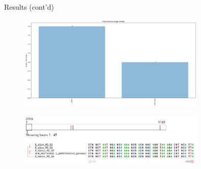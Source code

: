 \documentclass{beamer}
\begin{document}
\begin{frame}{Results (cont'd)}
	\begin{figure}[ht]
		\centering
		\includegraphics[width=0.8\textwidth,height=0.3\textheight]{img/Enterobacteria-phage-lambda.png}
		\caption*{\label{fig:Enterobacteria-hist}}
	\end{figure}
	\vspace{-1cm}
	\begin{figure}[ht]
		\centering
		\includegraphics[width=0.8\textwidth,height=0.4\textheight]{img/Enterobacteria-phage-lambda-msa.png}
		\caption*{\label{fig:Enterobacteria-msa}}
	\end{figure}

\end{frame}
\end{document}
